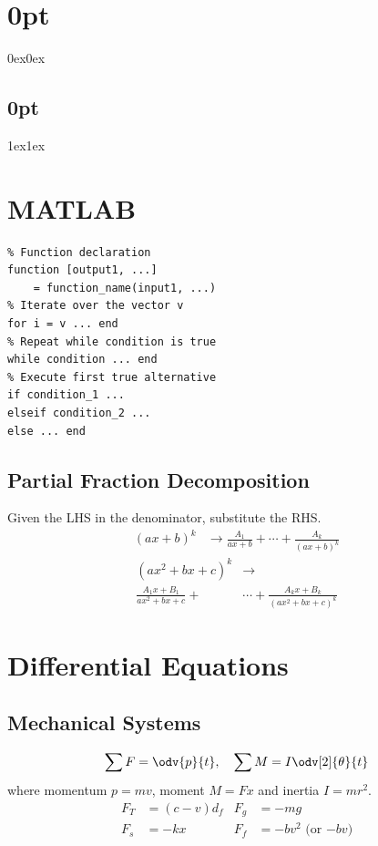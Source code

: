 \documentclass{article}
\begin{document}
\titlespacing*\section{0pt}{0ex}{0ex}
\titlespacing*\subsection{0pt}{1ex}{1ex}
%
\setlength{\abovecaptionskip}{-5pt}
\setlength{\textfloatsep}{0pt}
%
\setlength{\abovedisplayskip}{1pt}
\setlength{\belowdisplayskip}{1pt}
%
\lstset{language=Matlab, upquote=true}
%
\begin{multicols}{3}
    \section*{MATLAB}
    \lstset{belowskip=0pt, aboveskip=0pt}
    \begin{lstlisting}
% Function declaration
function [output1, ...]
    = function_name(input1, ...)
% Iterate over the vector v
for i = v ... end
% Repeat while condition is true
while condition ... end
% Execute first true alternative
if condition_1 ...
elseif condition_2 ...
else ... end
\end{lstlisting}
    \subsection*{Partial Fraction Decomposition}
    Given the LHS in the denominator, substitute the RHS\@.
    \begin{align*}
        \left(ax+b\right)^k & \to \frac{A_1}{ax+b} + \cdots + \frac{A_k}{\left( ax+b \right)^k}
    \end{align*}
    \begin{align*}
        \left(ax^2+bx+c\right)^k     & \to                                                   \\
        \frac{A_1x+B_1}{ax^2+bx+c} + & \cdots + \frac{A_k x+B_k}{\left( ax^2+bx+c \right)^k}
    \end{align*}
    \section*{Differential Equations}
    \subsection*{Mechanical Systems}
    \begin{equation*}
        \sum F = \odv{p}{t},\quad \sum M = I \odv[2]{\theta}{t}
    \end{equation*}
    where momentum \(p = mv\), moment \(M=Fx\) and inertia \(I=mr^2\).
    \begin{align*}
        F_T & = \left( c - v \right) d_f & F_g & = -mg                         \\
        F_s & = -kx                      & F_f & = -b v^2 \text{ (or \(-bv\))}
    \end{align*}

\end{multicols}
\end{document}
